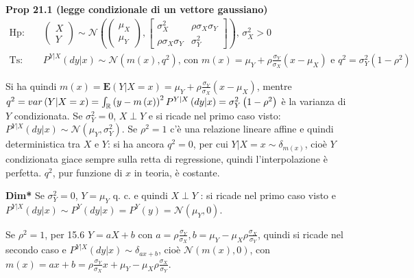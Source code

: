 \documentclass{article}
\begin{document}
\textbf{Prop 21.1 (legge condizionale di un vettore gaussiano)}%
\begin{eqnarray*}
\text{Hp}\text{: } &&\left( 
\begin{array}{c}
X \\ 
Y%
\end{array}%
\right) \sim \mathcal{N}\left( \left( 
\begin{array}{c}
\mu _{X} \\ 
\mu _{Y}%
\end{array}%
\right) ,\left[ 
\begin{array}{cc}
\sigma _{X}^{2} & \rho \sigma _{X}\sigma _{Y} \\ 
\rho \sigma _{X}\sigma _{Y} & \sigma _{Y}^{2}%
\end{array}%
\right] \right) \text{, }\sigma _{X}^{2}>0 \\
\text{Ts}\text{: } &&P^{Y|X}\left( dy|x\right) \sim \mathcal{N}\left(
m\left( x\right) ,q^{2}\right) \text{, con }m\left( x\right) =\mu _{Y}+\rho 
\frac{\sigma _{Y}}{\sigma _{X}}\left( x-\mu _{X}\right) \text{ e }%
q^{2}=\sigma _{Y}^{2}\left( 1-\rho ^{2}\right)
\end{eqnarray*}

Si ha quindi $m\left( x\right) =\mathbf{E}\left(
Y|X=x\right) =\mu _{Y}+\rho \frac{\sigma _{Y}}{\sigma _{X}}\left( x-\mu
_{X}\right) $, mentre $q^{2}=var\left( Y|X=x\right) =\int_{%
\mathbb{R}
}\left( y-m\left( x\right) \right) ^{2}P^{Y|X}\left( dy|x\right) =\sigma
_{Y}^{2}\left( 1-\rho ^{2}\right) $ \`{e} la varianza di $Y$ condizionata.
Se $\sigma _{Y}^{2}=0$, $X\perp Y$ e si ricade nel primo caso visto: $%
P^{Y|X}\left( dy|x\right) \sim \mathcal{N}\left( \mu _{Y},\sigma
_{Y}^{2}\right) $. Se $\rho ^{2}=1$ c'\`{e} una relazione lineare affine e
quindi deterministica tra $X$ e $Y$: si ha ancora $q^{2}=0$, per cui $%
Y|X=x\sim \delta _{m\left( x\right) }$, cio\`{e} $Y$ condizionata giace
sempre sulla retta di regressione, quindi l'interpolazione \`{e} perfetta. $%
q^{2}$, pur funzione di $x$ in teoria, \`{e} costante.

\textbf{Dim*} Se $\sigma _{Y}^{2}=0$, $Y=\mu _{Y}$ q. c. e quindi $X\perp Y$%
: si ricade nel primo caso visto e $P^{Y|X}\left( dy|x\right) \sim
P^{Y}\left( dy|x\right) =P^{Y}\left( y\right) =\mathcal{N}\left( \mu
_{Y},0\right) $.

Se $\rho ^{2}=1$, per 15.6 $Y=aX+b$ con $a=\rho \frac{\sigma _{Y}}{\sigma
_{X}},b=\mu _{Y}-\mu _{X}\rho \frac{\sigma _{X}}{\sigma _{Y}}$, quindi si
ricade nel secondo caso e $P^{Y|X}\left( dy|x\right) \sim \delta _{ax+b}$,
cio\`{e} $\mathcal{N}\left( m\left( x\right) ,0\right) $, con $m\left(
x\right) =ax+b=\rho \frac{\sigma _{Y}}{\sigma _{X}}x+\mu _{Y}-\mu _{X}\rho 
\frac{\sigma _{X}}{\sigma _{Y}}$.
\end{document}
